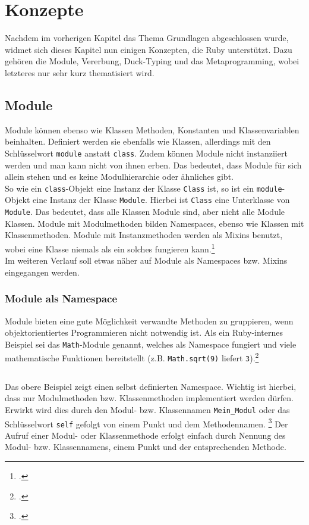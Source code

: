 \documentclass[a4paper, 11pt]{scrreprt}
\begin{document}
\chapter{Konzepte}
Nachdem im vorherigen Kapitel das Thema Grundlagen abgeschlossen wurde, widmet sich dieses Kapitel nun einigen Konzepten, die Ruby unterstützt. Dazu gehören die Module, Vererbung, Duck-Typing und das Metaprogramming, wobei letzteres nur sehr kurz thematisiert wird.

\section{Module}
Module können ebenso wie Klassen Methoden, Konstanten und Klassenvariablen beinhalten. Definiert werden sie ebenfalls wie Klassen, allerdings mit den Schlüsselwort \texttt{module} anstatt \texttt{class}. Zudem können Module nicht instanziiert werden und man kann nicht von ihnen erben. Das bedeutet, dass Module für sich allein stehen und es keine Modulhierarchie oder ähnliches gibt.\\
So wie ein \texttt{class}-Objekt eine Instanz der Klasse \texttt{Class} ist, so ist ein \texttt{module}-Objekt eine Instanz der Klasse \texttt{Module}. Hierbei ist \texttt{Class} eine Unterklasse von \texttt{Module}. Das bedeutet, dass alle Klassen Module sind, aber nicht alle Module Klassen. Module mit Modulmethoden bilden Namespaces, ebenso wie Klassen mit Klassenmethoden. Module mit Instanzmethoden werden als Mixins benutzt, wobei eine Klasse niemals als ein solches fungieren kann.\footcite[vgl.][S.247-248]{ruby_lang}\\
Im weiteren Verlauf soll etwas näher auf Module als Namespaces bzw. Mixins eingegangen werden.

\subsection{Module als Namespace}
Module bieten eine gute Möglichkeit verwandte Methoden zu gruppieren, wenn objektorientiertes Programmieren nicht notwendig ist. Als ein Ruby-internes Beispiel sei das \texttt{Math}-Module genannt, welches als Namespace fungiert und viele mathematische Funktionen bereitstellt (z.B. \texttt{Math.sqrt(9)} liefert \texttt{3}).\footcite[vgl.][S.248]{ruby_lang}
\inputminted[]{ruby}{namespace.rb}
Das obere Beispiel zeigt einen selbst definierten Namespace. Wichtig ist hierbei, dass nur Modulmethoden bzw. Klassenmethoden implementiert werden dürfen. Erwirkt wird dies durch den Modul- bzw. Klassennamen \texttt{Mein\_Modul} oder das Schlüsselwort \texttt{self} gefolgt von einem Punkt und dem Methodennamen. \footcite[vgl.][S.248-249]{ruby_lang}
Der Aufruf einer Modul- oder Klassenmethode erfolgt einfach durch Nennung des Modul- bzw. Klassennamens, einem Punkt und der entsprechenden Methode.
\end{document}
